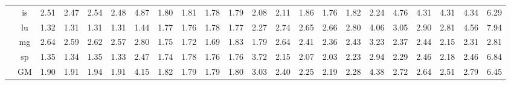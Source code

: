 \begin{table*}[]
\begin{center}
{\begin{tabular}{|c|c|rrrrr|rrrrr|rrrrr|rrrrr|}
 &  is  &  2.51  & \cellcolor{blue!25} 2.47  &  2.54  & \cellcolor{blue!25} 2.48  &   4.87  &  1.80  &  1.81  & \cellcolor{blue!25} 1.78  &  1.79  &  2.08  &  2.11  & \cellcolor{blue!25} 1.86  & \cellcolor{blue!25} 1.76  &  1.82  &   2.24  &  4.76  & \cellcolor{blue!25} 4.31  &  4.31  &  4.34  &   6.29 \\
 &  lu  &  1.32  & \cellcolor{blue!25} 1.31  &  1.31  &  1.31  &   1.44  &  1.77  & \cellcolor{blue!25} 1.76  &  1.78  & \cellcolor{blue!25} 1.77  &  2.27  &  2.74  & \cellcolor{blue!25} 2.65  &  2.66  &  2.80  &   4.06  &  3.05  & \cellcolor{blue!25} 2.90  & \cellcolor{blue!25} 2.81  &  4.56  &   7.94 \\
 &  mg  &  2.64  & \cellcolor{blue!25} 2.59  &  2.62  & \cellcolor{blue!25} 2.57  &   2.80  &  1.75  & \cellcolor{blue!25} 1.72  & \cellcolor{blue!25} 1.69  &  1.83  &  1.79  &  2.64  & \cellcolor{blue!25} 2.41  & \cellcolor{blue!25} 2.36  &  2.43  &   3.23  &  2.37  &  2.44  & \cellcolor{blue!25} 2.15  &  2.31  &   2.81 \\
 &  sp  &  1.35  & \cellcolor{blue!25} 1.34  &  1.35  & \cellcolor{blue!25} 1.33  &   2.47  &  1.74  &  1.78  & \cellcolor{blue!25} 1.76  &  1.76  &  3.72  &  2.15  & \cellcolor{blue!25} 2.07  & \cellcolor{blue!25} 2.03  &  2.23  &   2.94  &  2.29  &  2.46  & \cellcolor{blue!25} 2.18  &  2.46  &   6.84 \\ \cline{2-22}
 &  GM  &  1.90  &  1.91  &  1.94  & \cellcolor{blue!25} 1.91  &   4.15  &  1.82  & \cellcolor{blue!25} 1.79  &  1.79  &  1.80  &  3.03  &  2.40  & \cellcolor{blue!25} 2.25  & \cellcolor{blue!25} 2.19  &  2.28  &   4.38  &  2.72  & \cellcolor{blue!25} 2.64  & \cellcolor{blue!25} 2.51  &  2.79  &   6.45 \\
\hline 
\end{tabular} }

\end{center}
\end{table*}
